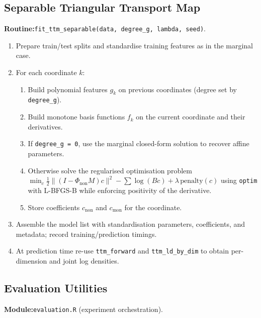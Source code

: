 \documentclass[11pt,a4paper,twoside]{book}\usepackage[]{graphicx}\usepackage[]{xcolor}
\begin{document}
\subsection{Separable Triangular Transport Map}\label{app:ttm-sep}

\textbf{Routine:}\quad\texttt{fit\_ttm\_separable(data, degree\_g, lambda, seed)}.

\begin{enumerate}
  \item Prepare train/test splits and standardise training features as in the marginal case.
  \item For each coordinate $k$:
    \begin{enumerate}
      \item Build polynomial features $g_k$ on previous coordinates (degree set by \texttt{degree\_g}).
      \item Build monotone basis functions $f_k$ on the current coordinate and their derivatives.
      \item If \texttt{degree\_g = 0}, use the marginal closed-form solution to recover affine parameters.
      \item Otherwise solve the regularised optimisation problem
            $\min_c \frac{1}{2}\lVert (I - \Phi_{\text{non}} M)c \rVert^2 - \sum \log (B c) + \lambda\,\text{penalty}(c)$
            using \texttt{optim} with L-BFGS-B while enforcing positivity of the derivative.
      \item Store coefficients $c_{\text{non}}$ and $c_{\text{mon}}$ for the coordinate.
    \end{enumerate}
  \item Assemble the model list with standardisation parameters, coefficients, and metadata; record training/prediction timings.
  \item At prediction time re-use \texttt{ttm\_forward} and \texttt{ttm\_ld\_by\_dim} to obtain per-dimension and joint log densities.
\end{enumerate}

\subsection{Evaluation Utilities}\label{app:evaluation}

\textbf{Module:}\quad\texttt{evaluation.R} (experiment orchestration).
\end{document}
